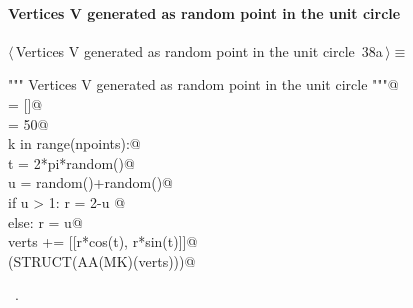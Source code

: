 \documentclass[11pt,oneside]{article}    %
\begin{document}
\paragraph{Vertices V generated as random point in the unit circle}
\begin{flushleft} \small \label{scrap60}
\protect{}$\langle\,$Vertices V generated as random point in the unit circle\nobreak\ {\footnotesize 38a}$\,\rangle\equiv$
\vspace{-1ex}
\begin{list}{}{} \item
\mbox{}\verb@""" Vertices V generated as random point in the unit circle """@\\
\mbox{}\verb@verts = []@\\
\mbox{}\verb@npoints = 50@\\
\mbox{}\verb@for k in range(npoints):@\\
\mbox{}\verb@    t = 2*pi*random()@\\
\mbox{}\verb@    u = random()+random()@\\
\mbox{}\verb@    if u > 1: r = 2-u @\\
\mbox{}\verb@    else: r = u@\\
\mbox{}\verb@    verts += [[r*cos(t), r*sin(t)]]@\\
\mbox{}\verb@VIEW(STRUCT(AA(MK)(verts)))@\\
\mbox{}\verb@@{\NWsep}
\end{list}
\vspace{-1ex}
\footnotesize\addtolength{\baselineskip}{-1ex}
\begin{list}{}{\setlength{\itemsep}{-\parsep}\setlength{\itemindent}{-\leftmargin}}
\item \NWtxtMacroRefIn\ .
\end{list}
\end{flushleft}
\end{document}
